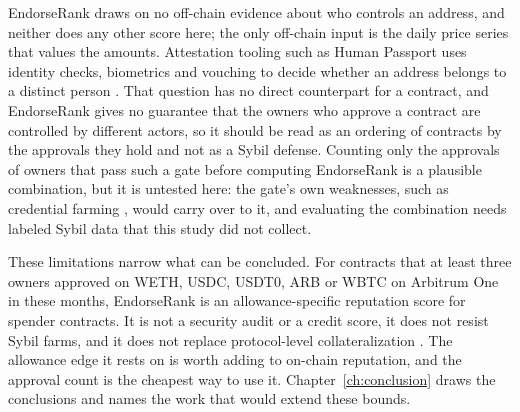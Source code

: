 EndorseRank draws on no off-chain evidence about who controls an address, and neither does any other score here; the only off-chain input is the daily price series that values the amounts. Attestation tooling such as Human Passport uses identity checks, biometrics and vouching to decide whether an address belongs to a distinct person \parencite{humanpassportnddocs}. That question has no direct counterpart for a contract, and EndorseRank gives no guarantee that the owners who approve a contract are controlled by different actors, so it should be read as an ordering of contracts by the approvals they hold and not as a Sybil defense. Counting only the approvals of owners that pass such a gate before computing EndorseRank is a plausible combination, but it is untested here: the gate's own weaknesses, such as credential farming \parencite{bordeianu2026sybil}, would carry over to it, and evaluating the combination needs labeled Sybil data that this study did not collect.

These limitations narrow what can be concluded. For contracts that at least three owners approved on WETH, USDC, USDT0, ARB or WBTC on Arbitrum One in these months, EndorseRank is an allowance-specific reputation score for spender contracts. It is not a security audit or a credit score, it does not resist Sybil farms, and it does not replace protocol-level collateralization \parencite{gudgeon2020crisis}. The allowance edge it rests on is worth adding to on-chain reputation, and the approval count is the cheapest way to use it. Chapter~\ref{ch:conclusion} draws the conclusions and names the work that would extend these bounds.
